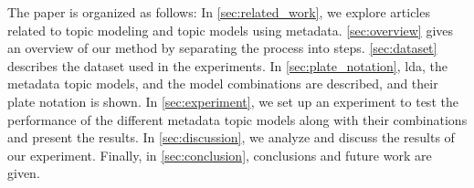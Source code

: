 The paper is organized as follows:
In \autoref{sec:related_work}, we explore articles related to topic modeling and topic models using metadata.
\autoref{sec:overview} gives an overview of our method by separating the process into steps.
\autoref{sec:dataset} describes the dataset used in the experiments.
In \autoref{sec:plate_notation}, \gls{lda}, the metadata topic models, and the model combinations are described, and their plate notation is shown.
In \autoref{sec:experiment}, we set up an experiment to test the performance of the different metadata topic models along with their combinations and present the results.
In \autoref{sec:discussion}, we analyze and discuss the results of our experiment.
Finally, in \autoref{sec:conclusion}, conclusions and future work are given.
